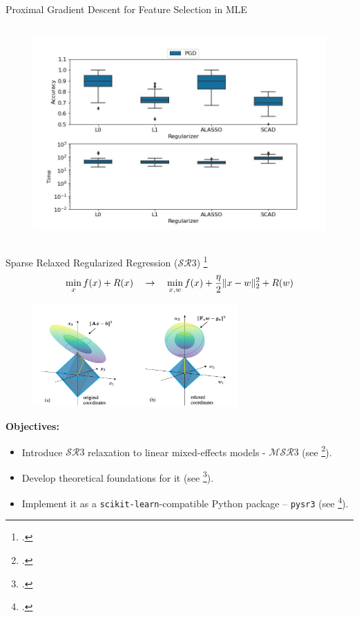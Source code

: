 \documentclass[8pt]{beamer}
\begin{document}
\begin{frame}{Proximal Gradient Descent for Feature Selection in MLE}
{\begin{columns}[T,onlytextwidth]
    	\vspace{1em}
    	\centering  
		\begin{figure}
			\includegraphics[width=\textwidth]{Figures/benchmark_pgd.jpg}
		\end{figure}
  \end{columns}
}
\end{frame}


\begin{frame}{Sparse Relaxed Regularized Regression ($\mathcal{SR}3$) \footcite{Zheng2018RelaxAndSplit}}
\begin{equation}
	\min_{x} f(x) + R(x)\quad \rightarrow \quad \min_{x, w} f(x) + \frac{\eta}{2} \|x-w\|_2^2 + R(w)
\end{equation}

\begin{figure}
	\includegraphics[width=0.7\textwidth]{Figures/intuition_prev_paper.png}
\end{figure}

\textbf{Objectives:}
\begin{itemize}
	\item Introduce $\mathcal{SR}3$ relaxation to linear mixed-effects models - $\mathcal{MSR}3$ (see \footcite{sholokhov2022relaxation}).
	\item Develop theoretical foundations for it (see \footcite{aravkin2022jimtheory}).
	\item Implement it as a \texttt{scikit-learn}-compatible Python package -- \texttt{pysr3} (see \footcite{sholokhov2023pysr3}).
\end{itemize}
\vspace{1em}

\end{frame}
\end{document}

